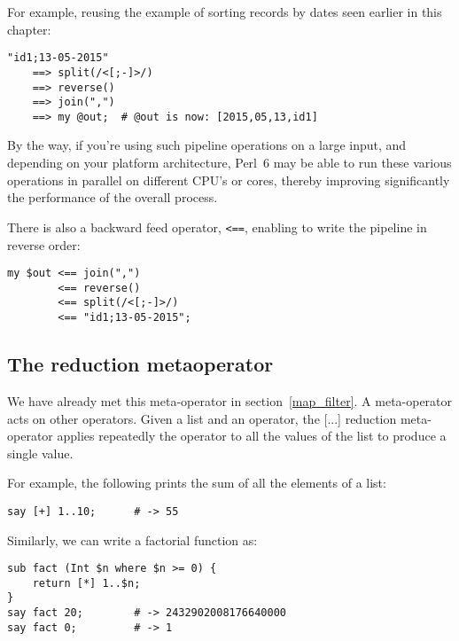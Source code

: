 For example, reusing the example of sorting records 
by dates seen earlier in this chapter:

\begin{verbatim}
"id1;13-05-2015" 
    ==> split(/<[;-]>/) 
    ==> reverse() 
    ==> join(",") 
    ==> my @out;  # @out is now: [2015,05,13,id1]
\end{verbatim}

By the way, if you're using such pipeline operations on 
a large input, and depending on your platform 
architecture, Perl~6 may be able to run these 
various operations in parallel on different CPU's or cores, 
thereby improving significantly the performance 
of the overall process.

There is also a backward feed operator, \verb'<==', 
enabling to write the pipeline in reverse order:
\ifplastex \else
{}
\fi

\begin{verbatim}
my $out <== join(",") 
        <== reverse() 
        <== split(/<[;-]>/) 
        <== "id1;13-05-2015";
\end{verbatim}


\subsection{The reduction metaoperator}

We have already met this meta-operator in section~\ref{map_filter}. 
A meta-operator acts on other operators. Given 
a list and an operator, the [...] reduction meta-operator 
applies repeatedly the operator to all the values of the
list to produce a single value.

For example, the following prints the sum of all the 
elements of a list:

\begin{verbatim}
say [+] 1..10;      # -> 55
\end{verbatim}

Similarly, we can write a factorial function as:

\begin{verbatim}
sub fact (Int $n where $n >= 0) {
    return [*] 1..$n;
}
say fact 20;        # -> 2432902008176640000
say fact 0;         # -> 1
\end{verbatim}

